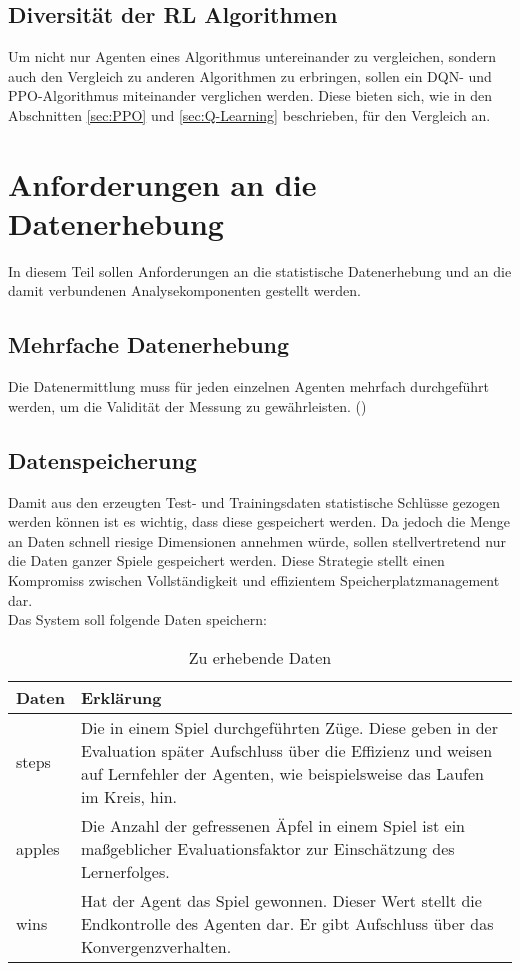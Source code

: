 \subsection{Diversität der RL Algorithmen} \label{sec:Anforderungen_Diversität}
Um nicht nur Agenten eines Algorithmus untereinander zu vergleichen, sondern auch den Vergleich zu anderen Algorithmen zu erbringen, sollen ein DQN- und PPO-Algorithmus miteinander verglichen werden. 
Diese bieten sich, wie in den Abschnitten \ref{sec:PPO} und \ref{sec:Q-Learning} beschrieben, für den Vergleich an.

\section{Anforderungen an die Datenerhebung} \label{sec:Anforderungen_an_die_Datenerhebung}
In diesem Teil sollen Anforderungen an die statistische Datenerhebung und an die damit verbundenen Analysekomponenten gestellt werden.

\subsection{Mehrfache Datenerhebung} \label{sec:Anforderungen_mehrfache_Datenerhebung}
Die Datenermittlung muss für jeden einzelnen Agenten mehrfach durchgeführt werden, um die Validität der Messung zu gewährleisten. (\cite[S. 135]{DL})

\subsection{Datenspeicherung} \label{sec:Anforderungen_Datenspeicherung}
Damit aus den erzeugten Test- und Trainingsdaten statistische Schlüsse gezogen werden können ist es wichtig, dass diese gespeichert werden. Da jedoch die Menge an Daten schnell riesige Dimensionen annehmen würde, sollen stellvertretend nur die Daten ganzer Spiele gespeichert werden. Diese Strategie stellt einen Kompromiss zwischen Vollständigkeit und effizientem Speicherplatzmanagement dar.\\
Das System soll folgende Daten speichern:
\begin{longtable}[h]{|p{4cm}|p{\linewidth - 5cm}|}
	\caption{Zu erhebende Daten}
	\label{tab:Datenerhebung} 
	\endfirsthead
	\endhead
	\hline
	Daten & Erklärung \\
	\hline
	steps & Die in einem Spiel durchgeführten Züge. Diese geben in der Evaluation später Aufschluss über die Effizienz und weisen auf Lernfehler der Agenten, wie beispielsweise das Laufen im Kreis, hin.\\
	\hline
	apples & Die Anzahl der gefressenen Äpfel in einem Spiel ist ein maßgeblicher Evaluationsfaktor zur Einschätzung des Lernerfolges.\\
	\hline
	wins & Hat der Agent das Spiel gewonnen. Dieser Wert stellt die Endkontrolle des Agenten dar. Er gibt Aufschluss über das Konvergenzverhalten.\\
	\hline
\end{longtable}


